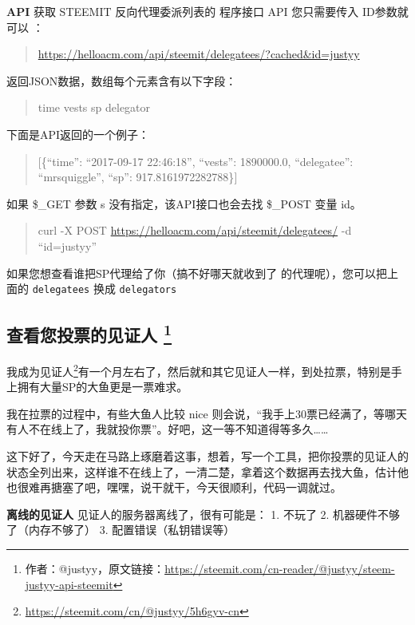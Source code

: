 \documentclass[]{ctexbook}
\renewcommand{\href}[2]{#2\footnote{\url{#1}}}
\begin{document}
\textbf{API}
获取 STEEMIT 反向代理委派列表的 程序接口 API 您只需要传入 ID参数就可以 ：

\begin{quote}
\url{https://helloacm.com/api/steemit/delegatees/?cached\&id=justyy}
\end{quote}

返回JSON数据，数组每个元素含有以下字段：

\begin{quote}
time
vests
sp
delegator
\end{quote}

下面是API返回的一个例子：

\begin{quote}
{[}\{``time'': ``2017-09-17 22:46:18'', ``vests'': 1890000.0, ``delegatee'': ``mrsquiggle'', ``sp'': 917.8161972282788\}{]}
\end{quote}

如果 \$\_GET 参数 s 没有指定，该API接口也会去找 \$\_POST 变量 id。

\begin{quote}
curl -X POST \url{https://helloacm.com/api/steemit/delegatees/} -d ``id=justyy''
\end{quote}

如果您想查看谁把SP代理给了你（搞不好哪天就收到了 \citet{ned} 的代理呢），您可以把上面的 \texttt{delegatees} 换成 \texttt{delegators}

\subsection[查看您投票的见证人 ]{\texorpdfstring{查看您投票的见证人 \footnote{作者：@justyy，原文链接：\url{https://steemit.com/cn-reader/@justyy/steem-justyy-api-steemit}}}{查看您投票的见证人 }}

我成为\href{https://steemit.com/cn/@justyy/5h6gyv-cn}{见证人}有一个月左右了，然后就和其它见证人一样，到处拉票，特别是手上拥有大量SP的大鱼更是一票难求。

我在拉票的过程中，有些大鱼人比较 nice 则会说，``我手上30票已经满了，等哪天有人不在线上了，我就投你票''。好吧，这一等不知道得等多久\ldots{}\ldots{}

这下好了，今天走在马路上琢磨着这事，想着，写一个工具，把你投票的见证人的状态全列出来，这样谁不在线上了，一清二楚，拿着这个数据再去找大鱼，估计他也很难再搪塞了吧，嘿嘿，说干就干，今天很顺利，代码一调就过。

\textbf{离线的见证人}
见证人的服务器离线了，很有可能是：
1. 不玩了
2. 机器硬件不够了（内存不够了）
3. 配置错误（私钥错误等）
\end{document}
